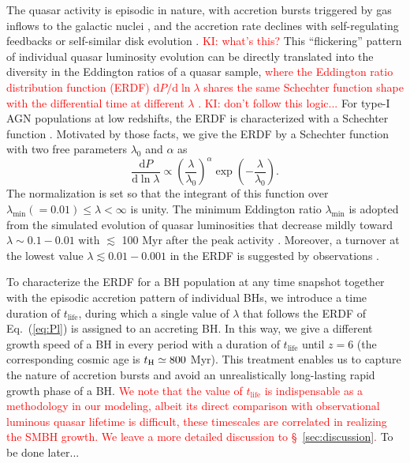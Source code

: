 \documentclass[twocolumn, twocolappendix]{aastex63}
\newcommand{\tlife}{t_\mathrm{life}}
\newcommand{\D}{\mathrm{d}}
\newcommand{\red}[1]{\textcolor{red}{ #1}}
\begin{document}
\begin{CJK*}{UTF8}{gbsn}
The quasar activity is episodic in nature, with accretion bursts triggered by gas inflows to the galactic nuclei
\citep{2005Natur.433..604D,2005ApJ...630..705H}, 
and the accretion rate declines with self-regulating feedbacks \citep[e.g.,][]{2008ApJ...686..815Y,2011ApJ...737...26N} or 
self-similar disk evolution \citep{1991MNRAS.248..754P,2005ApJ...634..901Y,2007MNRAS.377L..25K}. \red{KI: what's this?}
This ``flickering'' pattern of individual quasar luminosity evolution can be directly translated into the diversity in the Eddington ratios of a quasar sample, 
\red{where the Eddington ratio distribution function (ERDF) $\D P/ \D\ln\lambda$ shares the same Schechter function shape 
with the differential time at different $\lambda$ \citep{2006ApJ...639..700H,2009ApJ...698.1550H}.}
\red{KI: don't follow this logic...}
For type-I AGN populations at low redshifts, the ERDF is characterized with a Schechter function
\citep{2015MNRAS.447.2085S,2016ApJ...826...12J,2018MNRAS.474.1225A}.
Motivated by those facts, we give the ERDF by a Schechter function with two free parameters $\lambda_0$ and $\alpha$ as
\begin{equation}
  \label{eq:Pl}
  \frac{\D P}{ \D \ln \lambda} \propto
  \left(\frac{\lambda} {\lambda_0} \right)^\alpha \exp{\left(-\frac{\lambda}{\lambda_0}\right)}.
\end{equation}
The normalization is set so that the integrant of this function over $\lambda_\mathrm{min}(=0.01) \leq \lambda < \infty$ is unity.
The minimum Eddington ratio $\lambda_\mathrm{min}$ is adopted from the simulated evolution of quasar luminosities 
that decrease mildly toward $\lambda \sim 0.1-0.01$ with $\lesssim$ 100 Myr after the peak activity \citep{2011ApJ...737...26N}.
Moreover, a turnover at the lowest value $\lambda\lesssim 0.01-0.001$ in the ERDF is suggested by observations \citep{2018MNRAS.474.1225A}.  




To characterize the ERDF for a BH population at any time snapshot together with the episodic accretion pattern of individual BHs, 
we introduce a time duration of $\tlife$, during which a single value of $\lambda$ that follows the ERDF of Eq.~(\ref{eq:Pl}) is assigned to an accreting BH.
In this way, we give a different growth speed of a BH in every period with a duration of $\tlife$ until $z=6$ (the corresponding cosmic age is $t_{\rm H}\simeq 800$ Myr).
This treatment enables us to capture the nature of accretion bursts and avoid an unrealistically long-lasting rapid growth phase of a BH.
\red{We note that the value of $\tlife$ is indispensable as a methodology in our modeling, 
albeit its direct comparison with observational luminous quasar lifetime is difficult, 
these timescales are correlated in realizing the SMBH growth. 
We leave a more detailed discussion to \S~\ref{sec:discussion}.}
To be done later...



\end{CJK*}
\end{document}
